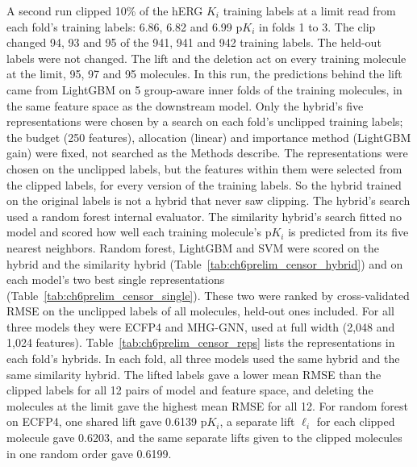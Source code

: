 A second run clipped 10\% of the hERG $K_i$ training labels at a limit read from each fold's training labels: 6.86, 6.82 and 6.99 p$K_i$ in folds 1 to 3. The clip changed 94, 93 and 95 of the 941, 941 and 942 training labels. The held-out labels were not changed. The lift and the deletion act on every training molecule at the limit, 95, 97 and 95 molecules. In this run, the predictions behind the lift came from LightGBM on 5 group-aware inner folds of the training molecules, in the same feature space as the downstream model. Only the hybrid's five representations were chosen by a search on each fold's unclipped training labels; the budget (250 features), allocation (linear) and importance method (LightGBM gain) were fixed, not searched as the Methods describe. The representations were chosen on the unclipped labels, but the features within them were selected from the clipped labels, for every version of the training labels. So the hybrid trained on the original labels is not a hybrid that never saw clipping. The hybrid's search used a random forest internal evaluator. The similarity hybrid's search fitted no model and scored how well each training molecule's p$K_i$ is predicted from its five nearest neighbors. Random forest, LightGBM and SVM were scored on the hybrid and the similarity hybrid (Table~\ref{tab:ch6prelim_censor_hybrid}) and on each model's two best single representations (Table~\ref{tab:ch6prelim_censor_single}). These two were ranked by cross-validated RMSE on the unclipped labels of all molecules, held-out ones included. For all three models they were ECFP4 and MHG-GNN, used at full width (2,048 and 1,024 features). Table~\ref{tab:ch6prelim_censor_reps} lists the representations in each fold's hybrids. In each fold, all three models used the same hybrid and the same similarity hybrid. The lifted labels gave a lower mean RMSE than the clipped labels for all 12 pairs of model and feature space, and deleting the molecules at the limit gave the highest mean RMSE for all 12. For random forest on ECFP4, one shared lift gave 0.6139 p$K_i$, a separate lift $\ell_i$ for each clipped molecule gave 0.6203, and the same separate lifts given to the clipped molecules in one random order gave 0.6199.

